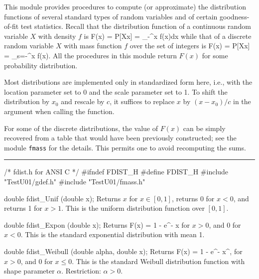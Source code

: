 
This module provides procedures to compute (or approximate)
the distribution functions of several standard types of random variables
and of certain goodness-of-fit test statistics.
Recall that the distribution function of a continuous random variable $X$
with density $f$ is
\eq
  F(x) = P[X\le x] = \int_{-\infty}^x f(x)dx
\endeq
while that of a discrete random variable $X$ with mass function $f$
over the set of integers is
\eq
  F(x) = P[X\le x] = \sum_{s=-\infty}^x f(x).
\endeq
All the procedures in this module return $F(x)$ for some
probability distribution.

Most distributions are implemented only in standardized form here,
i.e., with the location parameter set to 0 and the scale parameter
set to 1.  To shift the distribution by $x_0$ and rescale by $c$,
it suffices to replace $x$ by $(x-x_0)/c$ in the argument when
calling the function.

 For some of the discrete distributions, the value of $F(x)$ can be
 simply recovered from a table that would have been previously
 constructed; see the module {\tt fmass} for the details.
 This permits one to avoid recomputing the sums.


\bigskip\hrule\medskip
\code\hide
/* fdist.h for ANSI C */
#ifndef FDIST_H
#define FDIST_H
\endhide
#include "TestU01/gdef.h"
#include "TestU01/fmass.h"
\endcode


\code

double fdist_Unif (double x);
\endcode
  \tab
  Returns $x$ for $x \in [0, 1]$, returns 0 for $x < 0$, and returns 1
  for $x > 1$. This is the uniform distribution function over $[0, 1]$.
 \endtab
\code


double fdist_Expon (double x);
\endcode
 \tab
  Returns
  \eq
   F(x) = 1 - e^{- x}                          
  \endeq
  for $x > 0$, and 0 for $x<0$.  This is the standard exponential
  distribution \cite{tJOH95a} with mean 1.
 \endtab
\code


double fdist_Weibull (double alpha, double x);
\endcode
  \tab
  Returns
  \eq
   F(x) = 1 - e^{- x^\alpha},                 
  \endeq
  for $x>0$, and 0 for $x\le 0$.
  This is the standard Weibull distribution function \cite{tJOH95a} with shape
  parameter $\alpha$.
  Restriction: $\alpha > 0$.
 \endtab
\code


